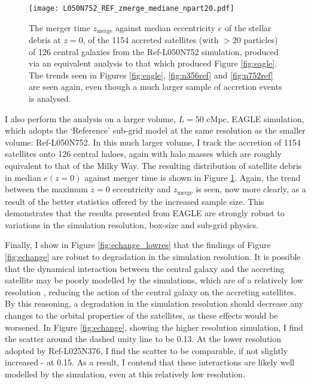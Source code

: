 \begin{figure}
\texttt{[image: L050N752\_REF\_zmerge\_mediane\_npart20.pdf]}
\caption[The equivalent of Figure \ref{fig:eagle} for haloes in the Ref-L050N752 simulation]{\label{fig:l50} The merger time $z_\mathrm{merge}$ against
median eccentricity $e$ of the stellar debris at $z=0$, of the 1154
accreted satellites (with $> 20$ particles) of 126 central galaxies
from the Ref-L050N752 simulation, produced via an equivalent analysis
to that which produced Figure \ref{fig:eagle}. The trends seen in
Figures \ref{fig:eagle}, \ref{fig:n356ref} and \ref{fig:n752ref}
are seen again, even though a much larger sample of accretion events
is analysed.} \end{figure}

I also perform the analysis on a larger volume, $L=50$ cMpc, EAGLE
simulation, which adopts the `Reference' sub-grid model at the same resolution as the smaller volume: Ref-L050N752.
In this much larger volume, I
track the accretion of 1154 satellites onto 126 central haloes,
again with halo masses which are roughly equivalent to that of the
Milky Way. The resulting distribution of satellite debris in median
$e(z=0)$  against merger time is shown in Figure \ref{fig:l50}.
Again, the trend between the maximum $z=0$ eccentricity and
$z_\mathrm{merge}$ is seen, now more clearly, as a result of the
better statistics offered by the increased sample size. This
demonstrates that the results presented from EAGLE are strongly
robust to variations in the simulation resolution, box-size and
sub-grid physics.

Finally, I show in Figure \ref{fig:echange_lowres} that the findings
of Figure \ref{fig:echange} are robust to degradation in the
simulation resolution. It is possible that the dynamical interaction
between the central galaxy and the accreting satellite may be poorly
modelled by the simulations, which are of a relatively low resolution
\citep[as opposed to idealised simulations such as those of
e.g.][]{2017MNRAS.464.2882A}, reducing the action of the central
galaxy on the accreting satellites. By this reasoning, a degradation
in the simulation resolution should decrease any changes to the
orbital properties of the satellites, as these effects would be
worsened. In Figure \ref{fig:echange}, showing the higher resolution
simulation, I find the scatter around the dashed unity line to be
0.13. At the lower resolution adopted by Ref-L025N376, I find the scatter to be comparable,
if not slightly increased - at 0.15. As a result, I contend that
these interactions are likely well modelled by the simulation, even
at this relatively low resolution.

